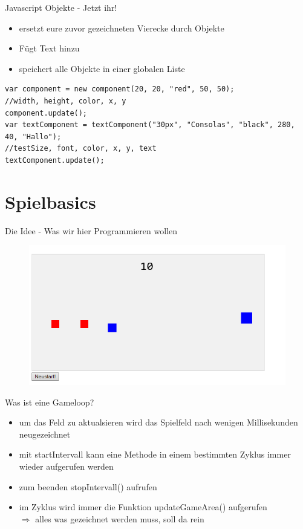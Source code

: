 \documentclass[18pt]{beamer}
\begin{document}
\begin{frame}[fragile]{Javascript Objekte - Jetzt ihr!}
\begin{itemize}
	\item ersetzt eure zuvor gezeichneten Vierecke durch Objekte
	\item Fügt Text hinzu
	\item speichert alle Objekte in einer globalen Liste
	

\end{itemize}
\begin{lstlisting}
var component = new component(20, 20, "red", 50, 50);
//width, height, color, x, y
component.update();
var textComponent = textComponent("30px", "Consolas", "black", 280, 40, "Hallo");
//testSize, font, color, x, y, text
textComponent.update();
\end{lstlisting}
\end{frame}



\section{Spielbasics}

\begin{frame}{Die Idee - Was wir hier Programmieren wollen}
\begin{figure}[htb]
	\centering
	\includegraphics[width=1\textwidth]{logos/game}
\end{figure}
\end{frame}

\begin{frame}{Was ist eine Gameloop?}
\begin{itemize}
	\item um das Feld zu aktualsieren wird das Spielfeld nach wenigen Millisekunden neugezeichnet
	\item mit startIntervall kann eine Methode in einem bestimmten Zyklus immer wieder aufgerufen werden 
	\item zum beenden stopIntervall() aufrufen
	\item im Zyklus wird immer die Funktion updateGameArea() aufgerufen\\ \( \Rightarrow \) alles was gezeichnet werden muss, soll da rein
\end{itemize}
\end{frame}
\end{document}
